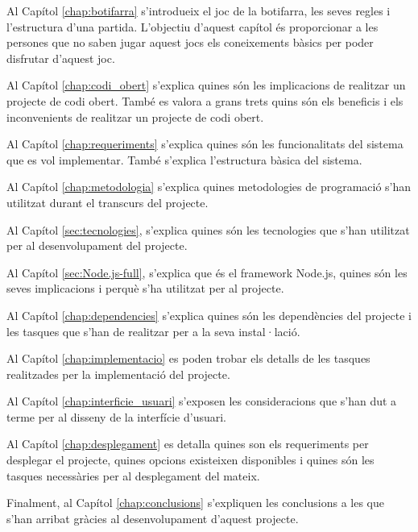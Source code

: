 Al Capítol \ref{chap:botifarra} s'introdueix el joc de la botifarra, les seves regles i l'estructura d'una partida. L'objectiu d'aquest capítol és proporcionar a les persones que no saben jugar aquest jocs els coneixements bàsics per poder disfrutar d'aquest joc. 

Al Capítol \ref{chap:codi_obert} s'explica quines són les implicacions de realitzar un projecte de codi obert. També es valora a grans trets quins són els beneficis i els inconvenients de realitzar un projecte de codi obert.

Al Capítol \ref{chap:requeriments} s'explica quines són les funcionalitats del sistema que es vol implementar. També s'explica l'estructura bàsica del sistema. 

Al Capítol \ref{chap:metodologia} s'explica quines metodologies de programació s'han utilitzat durant el transcurs del projecte.

Al Capítol \ref{sec:tecnologies}, s'explica quines són les tecnologies que s'han utilitzat per al desenvolupament del projecte.

Al Capítol \ref{sec:Node.js-full}, s'explica que és el framework Node.js, quines són les seves implicacions i perquè s'ha utilitzat per al projecte. 

Al Capítol \ref{chap:dependencies} s'explica quines són les dependències del projecte i les tasques que s'han de realitzar per a la seva instal·lació. 

Al Capítol \ref{chap:implementacio} es poden trobar els detalls de les tasques realitzades per la implementació del projecte. 

Al Capítol \ref{chap:interficie_usuari} s'exposen les consideracions que s'han dut a terme per al disseny de la interfície d'usuari.

Al Capítol \ref{chap:desplegament} es detalla quines son els requeriments per desplegar el projecte, quines opcions existeixen disponibles i quines són les tasques necessàries per al desplegament del mateix. 

Finalment, al Capítol \ref{chap:conclusions} s'expliquen les conclusions a les que s'han arribat gràcies al desenvolupament d'aquest projecte. 
